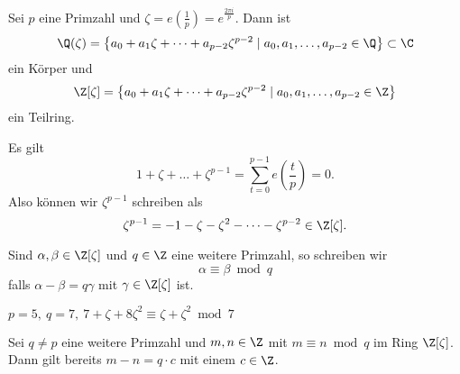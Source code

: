 Sei $p$ eine Primzahl und $\zeta = e\left( \frac{1}{p} \right) = e^{\frac{2\pi i}{p}}$. Dann ist
\[ \Q(\zeta) = \big\{ a_0 + a_1\zeta + \dots + a_{p-2}\zeta^{p-2} \mid a_0,a_1,\dotsc,a_{p-2} \in \Q \big\} \subset \C \]
ein Körper und
\[ \Z[\zeta] = \big\{ a_0 + a_1\zeta + \dots + a_{p-2}\zeta^{p-2} \mid a_0,a_1,\dotsc,a_{p-2} \in \Z \big\} \]
ein Teilring.

\begin{rem*}
	Es gilt
	\[ 1 + \zeta + \dots + \zeta^{p-1} = \sum_{t=0}^{p-1} e\left( \frac{t}{p} \right) = 0. \]
	Also können wir $\zeta^{p-1}$ schreiben als
	\[ \zeta^{p-1} = -1 - \zeta - \zeta^2 - \dots - \zeta^{p-2} \in \Z[\zeta]. \]
\end{rem*}

\begin{notat*}
	Sind $\alpha,\beta \in \Z[\zeta]$ und $q \in \Z$ eine weitere Primzahl, so schreiben wir 
	\[ \alpha \equiv \beta \bmod q \]
	falls $\alpha-\beta = q\gamma$ mit $\gamma \in \Z[\zeta]$ ist.
\end{notat*}

\begin{exmp*}
	$p=5,\ q = 7,\ 7 + \zeta + 8\zeta^2 \equiv \zeta + \zeta^2 \bmod 7$
\end{exmp*}

\begin{lem}\autolabel
	Sei $q \neq p$ eine weitere Primzahl und $m,n \in \Z$ mit $m \equiv n \bmod q$ im Ring $\Z[\zeta]$. Dann gilt bereits $m-n = q \cdot c$ mit einem $c \in \Z$.
\end{lem}